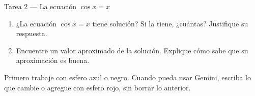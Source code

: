 \documentclass[11pt,letterpaper]{article}
\begin{document}
\begin{tarea}{Tarea 2 --- La ecuación $\cos x = x$}
\begin{enumerate}[label=\alph*)]
  \item ¿La ecuación $\cos x = x$ tiene solución? Si la tiene, ¿cuántas? Justifique su respuesta.
  \item Encuentre un valor aproximado de la solución. Explique cómo sabe que su aproximación es buena.
\end{enumerate}
\vspace{5cm}
\end{tarea}

{\small Primero trabaje con esfero azul o negro. Cuando pueda usar Gemini, escriba lo que cambie o agregue con esfero rojo, sin borrar lo anterior.}
\end{document}
